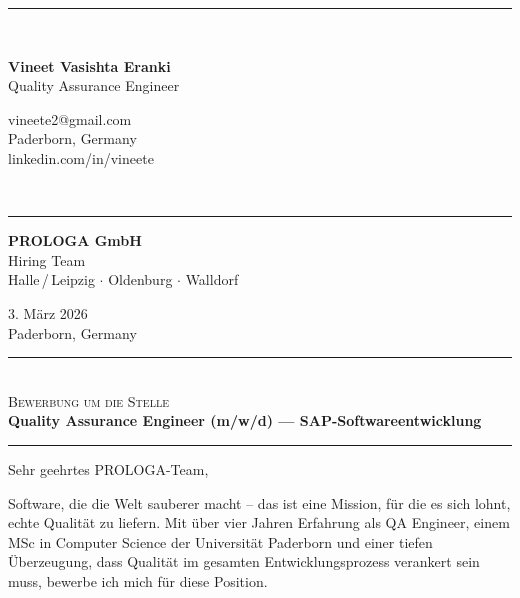 \documentclass[10.5pt, a4paper]{article}
\begin{document}
{\color{prologreen}\rule{\linewidth}{1.8pt}}\\[5pt]
\begin{minipage}[t]{0.55\textwidth}
  {\LARGE\textbf{Vineet Vasishta Eranki}}\\[3pt]
  {\small\color{muted} Quality Assurance Engineer}
\end{minipage}
\hfill
\begin{minipage}[t]{0.42\textwidth}
  \raggedleft
  {\small\color{muted}
   vineete2@gmail.com \\
    Paderborn, Germany \\
    linkedin.com/in/vineete
  }
\end{minipage}\\[5pt]
{\color{prologreen}\rule{\linewidth}{0.5pt}}


\begin{minipage}[t]{0.52\textwidth}
  \textbf{PROLOGA GmbH}\\
  Hiring Team\\
  Halle\,/\,Leipzig $\cdot$ Oldenburg $\cdot$ Walldorf
\end{minipage}
\hfill
\begin{minipage}[t]{0.42\textwidth}
  \raggedleft
  {\small\color{muted} 3. M\"{a}rz 2026\\Paderborn, Germany}
\end{minipage}


{\color{prologreen}\rule{\linewidth}{0.8pt}}\\[5pt]
{\footnotesize\color{muted}\textsc{Bewerbung um die Stelle}}\\[3pt]
{\large\textbf{Quality Assurance Engineer (m/w/d) --- SAP-Softwareentwicklung}}\\[5pt]
{\color{muted}\rule{\linewidth}{0.4pt}}


Sehr geehrtes PROLOGA-Team,

Software, die die Welt sauberer macht -- das ist eine Mission, f\"{u}r die es sich lohnt, echte Qualit\"{a}t zu liefern. Mit \"{u}ber vier Jahren Erfahrung als QA Engineer, einem MSc in Computer Science der Universit\"{a}t Paderborn und einer tiefen \"{U}berzeugung, dass Qualit\"{a}t im gesamten Entwicklungsprozess verankert sein muss, bewerbe ich mich f\"{u}r diese Position.
\end{document}

